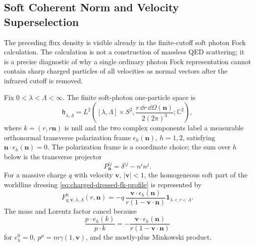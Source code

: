 \subsection{Soft Coherent Norm and Velocity Superselection}

The preceding flux density is visible already in the finite-cutoff soft
photon Fock calculation.  The calculation is not a construction of massless
QED scattering; it is a precise diagnostic of why a single ordinary photon
Fock representation cannot contain sharp charged particles of all velocities
as normal vectors after the infrared cutoff is removed.

Fix \(0<\lambda<\Lambda<\infty\).  The finite soft-photon one-particle space
is
\[
  \mathfrak h_{\lambda,\Lambda}
  =
  L^2\!\left(
    [\lambda,\Lambda]\times S^2,
    \frac{r\,\dd r\,\dd\Omega(\mathbf n)}{2(2\pi)^3};
    \mathbb C^2
  \right),
\]
where \(k=(r,r\mathbf n)\) is null and the two complex components label a
measurable orthonormal transverse polarization frame
\(\epsilon_h(\mathbf n)\), \(h=1,2\), satisfying
\(\mathbf n\cdot\epsilon_h(\mathbf n)=0\).  The polarization frame is a
coordinate choice; the sum over \(h\) below is the transverse projector
\[
  P_{\mathbf n}^{ij}=\delta^{ij}-n^in^j .
\]
For a massive charge \(q\) with velocity \(\mathbf v\), \(|\mathbf v|<1\), the
homogeneous soft part of the worldline dressing
\eqref{eq:charged-dressed-fk-profile} is represented by
\begin{equation}
  F_{q,\mathbf v,\lambda,\Lambda}^{h}(r,\mathbf n)
  =
  -q\,\frac{\mathbf v\cdot\epsilon_h(\mathbf n)}
           {r(1-\mathbf v\cdot\mathbf n)}
  \mathbf 1_{\lambda<r<\Lambda}.
  \label{eq:charged-soft-coherent-profile-velocity}
\end{equation}
The mass and Lorentz factor cancel because
\[
  \frac{p\cdot e_h(k)}{p\cdot k}
  =
  -\frac{\mathbf v\cdot\epsilon_h(\mathbf n)}
          {r(1-\mathbf v\cdot\mathbf n)}
\]
for \(e_h^0=0\), \(p^\mu=m\gamma(1,\mathbf v)\), and the mostly-plus
Minkowski product.

